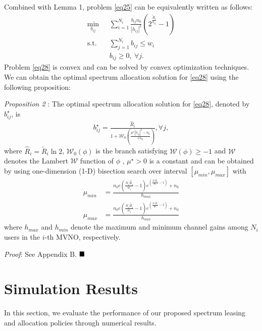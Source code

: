 \documentclass[journal]{IEEEtran}
\begin{document}
Combined with Lemma 1, problem \eqref{eq25} can be equivalently written as follows:
\begin{subequations}\label{eq28}
	\begin{align}
	\min_{b_{ij}}\ & \sum\limits_{i = 1}^{N_i} \frac{b_{ij}n_0}{\left|h_{ij}\right|^2}\left(2^{\frac{\tilde{R}_i}{b_{ij}}} - 1\right) \label{q28a} \\ \mbox{s.t.} \quad &  \sum\limits_{j = 1}^{N_i} b_{ij} \leq w_i \label{q28b} \\
	& b_{ij} \geq 0, \ \forall j. \label{q14c}
	\end{align}
\end{subequations}
Problem \eqref{eq28} is convex and can be solved by convex optimization techniques. We can obtain the optimal spectrum allocation solution for \eqref{eq28} using the following proposition:

\textit{Proposition 2} : The optimal spectrum allocation solution for \eqref{eq28}, denoted by $b_{ij}^\star$, is
\begin{align}
b_{ij}^\star = \frac{\hat{R}_i}{1 + \mathcal{W}_0\left(\frac{\mu^{\star}\left|h_{ij}\right|^2 - n_0}{en_0}\right)}, \forall j,
\end{align}
where $\hat{R}_i = \tilde{R}_i\ln2$, $\mathcal{W}_0\left(\phi\right)$ is the branch satisfying $\mathcal{W}\left(\phi\right) \geq -1$ and $\mathcal{W}$ denotes the Lambert $\mathcal{W}$ function of $\phi$ \cite{RMCorless}, $\mu^{\star} > 0$ is a constant and can be obtained by using one-dimension (1-D) bisection search over interval $\left[\mu_{min}, \mu_{max}\right]$ with
\begin{align}
\mu_{min} &= \frac{n_0e\left(\frac{N_i\hat{R}_i}{w_i} - 1\right)e^{\left(\frac{N_i\hat{R}_i}{w_i} - 1\right)} + n_0}{h_{max}}  \\
\mu_{max} & = \frac{n_0e\left(\frac{N_i\hat{R}_i}{w_i} - 1\right)e^{\left(\frac{N_i\hat{R}_i}{w_i} - 1\right)} + n_0}{h_{min}}
\end{align}
where $h_{max}$ and $h_{min}$ denote the maximum and minimum channel gains among $N_i$ users in the $i$-th MVNO, respectively.

\textit{Proof}: See Appendix B.  $\hfill\blacksquare$
\section{Simulation Results}
In this section, we evaluate the performance of our proposed spectrum leasing and allocation policies through numerical results. 
\end{document}
